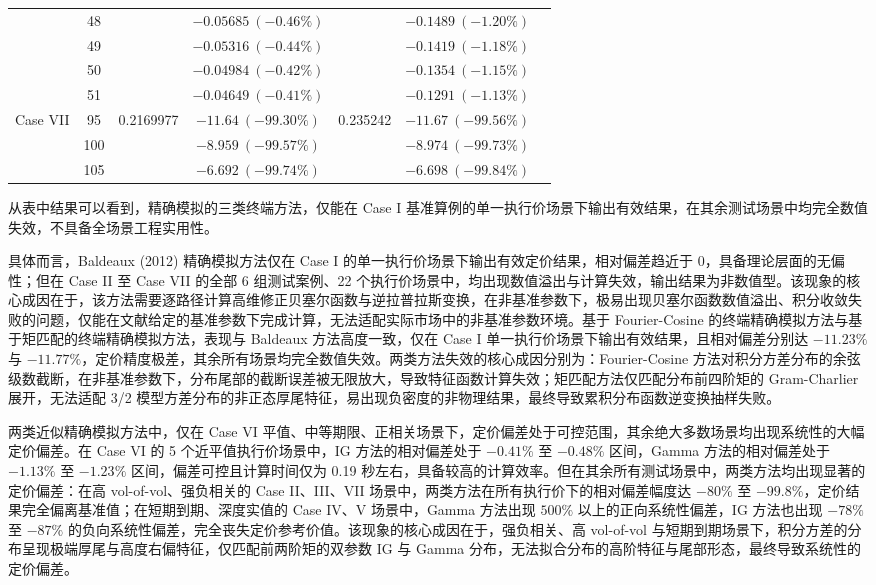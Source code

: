 \begin{table}[htbp]
{\begin{tabular}{lclcccc}
    & 48 &  & $-0.05685\ (-0.46\%)$ &  & $-0.1489\ (-1.20\%)$ \\
    & 49 &  & $-0.05316\ (-0.44\%)$ &  & $-0.1419\ (-1.18\%)$ \\
    & 50 &  & $-0.04984\ (-0.42\%)$ &  & $-0.1354\ (-1.15\%)$ \\
    & 51 &  & $-0.04649\ (-0.41\%)$ &  & $-0.1291\ (-1.13\%)$ \\
    \midrule
    \multirow{3}{*}{Case VII} & 95 & 0.2169977 & $-11.64\ (-99.30\%)$ & 0.235242 & $-11.67\ (-99.56\%)$ \\
    & 100 &  & $-8.959\ (-99.57\%)$ &  & $-8.974\ (-99.73\%)$ \\
    & 105 &  & $-6.692\ (-99.74\%)$ &  & $-6.698\ (-99.84\%)$ \\
    \bottomrule
  \end{tabular}%
  }
\end{table}
从表中结果可以看到，精确模拟的三类终端方法，仅能在 Case I 基准算例的单一执行价场景下输出有效结果，在其余测试场景中均完全数值失效，不具备全场景工程实用性。

具体而言，Baldeaux (2012) 精确模拟方法仅在 Case I 的单一执行价场景下输出有效定价结果，相对偏差趋近于 0，具备理论层面的无偏性；但在 Case II 至 Case VII 的全部 6 组测试案例、22 个执行价场景中，均出现数值溢出与计算失效，输出结果为非数值型。该现象的核心成因在于，该方法需要逐路径计算高维修正贝塞尔函数与逆拉普拉斯变换，在非基准参数下，极易出现贝塞尔函数数值溢出、积分收敛失败的问题，仅能在文献给定的基准参数下完成计算，无法适配实际市场中的非基准参数环境。基于 Fourier-Cosine 的终端精确模拟方法与基于矩匹配的终端精确模拟方法，表现与 Baldeaux 方法高度一致，仅在 Case I 单一执行价场景下输出有效结果，且相对偏差分别达 $-11.23\%$ 与 $-11.77\%$，定价精度极差，其余所有场景均完全数值失效。两类方法失效的核心成因分别为：Fourier-Cosine 方法对积分方差分布的余弦级数截断，在非基准参数下，分布尾部的截断误差被无限放大，导致特征函数计算失效；矩匹配方法仅匹配分布前四阶矩的 Gram-Charlier 展开，无法适配 3/2 模型方差分布的非正态厚尾特征，易出现负密度的非物理结果，最终导致累积分布函数逆变换抽样失败。

两类近似精确模拟方法中，仅在 Case VI 平值、中等期限、正相关场景下，定价偏差处于可控范围，其余绝大多数场景均出现系统性的大幅定价偏差。在 Case VI 的 5 个近平值执行价场景中，IG 方法的相对偏差处于 $-0.41\%$ 至 $-0.48\%$ 区间，Gamma 方法的相对偏差处于 $-1.13\%$ 至 $-1.23\%$ 区间，偏差可控且计算时间仅为 0.19 秒左右，具备较高的计算效率。但在其余所有测试场景中，两类方法均出现显著的定价偏差：在高 vol-of-vol、强负相关的 Case II、III、VII 场景中，两类方法在所有执行价下的相对偏差幅度达 $-80\%$ 至 $-99.8\%$，定价结果完全偏离基准值；在短期到期、深度实值的 Case IV、V 场景中，Gamma 方法出现 $500\%$ 以上的正向系统性偏差，IG 方法也出现 $-78\%$ 至 $-87\%$ 的负向系统性偏差，完全丧失定价参考价值。该现象的核心成因在于，强负相关、高 vol-of-vol 与短期到期场景下，积分方差的分布呈现极端厚尾与高度右偏特征，仅匹配前两阶矩的双参数 IG 与 Gamma 分布，无法拟合分布的高阶特征与尾部形态，最终导致系统性的定价偏差。

